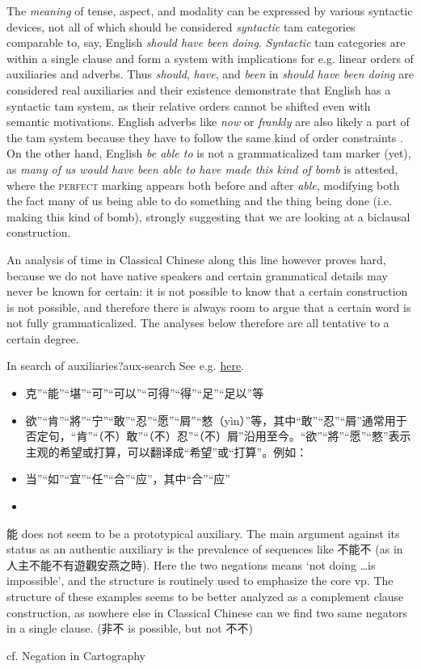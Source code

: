 \documentclass[UTF8, a4paper, oneside, scheme=plain, 12pt]{ctexrep}
\newcommand{\form}[1]{\emph{#1}}
\newcommand{\translate}[1]{`#1'}
\newcommand*{\category}[1]{\textsc{#1}}
\begin{document}
The \emph{meaning} of tense, aspect, and modality can be expressed by various syntactic devices,
not all of which should be considered \emph{syntactic} \ac{tam} categories comparable to, say, English \form{should have been doing}.
\emph{Syntactic} \ac{tam} categories are within a single clause
and form a system with implications for e.g. linear orders of auxiliaries and adverbs.
Thus \form{should}, \form{have}, and \form{been} in \form{should have been doing}
are considered real auxiliaries and their existence demonstrate that English has a syntactic \ac{tam} system,
as their relative orders cannot be shifted even with semantic motivations.
English adverbs like \form{now} or \form{frankly} are also likely a part of the \ac{tam} system
because they have to follow the same kind of order constraints \citep{cinque1999adverbs}.
On the other hand, English \form{be able to} is not a grammaticalized \ac{tam} marker (yet),
as \form{many of us would have been able to have made this kind of bomb} is attested,
where the \category{perfect} marking appears both before and after \form{able},
modifying both the fact many of us being able to do something
and the thing being done (i.e. making this kind of bomb),
strongly suggesting that we are looking at a biclausal construction.

An analysis of time in Classical Chinese along this line however proves hard,
because we do not have native speakers and certain grammatical details may never be known for certain:
it is not possible to know that a certain construction is not possible,
and therefore there is always room to argue that a certain word is not fully grammaticalized.
The analyses below therefore are all tentative to a certain degree.

\begin{todobox}{In search of auxiliaries?}{aux-search}
    See e.g. \href{http://www.ziyexing.com/files-5/guhanyu/guhanyu_3_1.htm}{here}.
    \begin{itemize}
        \item 克”“能”“堪”“可”“可以”“可得”“得”“足”“足以”等
        \item 欲”“肯”“將”“宁”“敢”“忍”“愿”“屑”“憗（yìn）”等，其中“敢”“忍”“屑”通常用于否定句，“肯”“（不）敢”“（不）忍”“（不）屑”沿用至今。“欲”“將”“愿”“憗”表示主观的希望或打算，可以翻译成“希望”或“打算”。例如：
        \item 当”“如”“宜”“任”“合”“应”，其中“合”“应”
        \item 
    \end{itemize}
    
    能 does not seem to be a prototypical auxiliary.
    The main argument against its status as an authentic auxiliary is the prevalence of sequences like 不能不 (as in 人主不能不有遊觀安燕之時).
    Here the two negations means \translate{not doing \dots is impossible},
    and the structure is routinely used to emphasize the core \ac{vp}.
    The structure of these examples seems to be better analyzed as a complement clause construction,
    as nowhere else in Classical Chinese can we find two same negators in a single clause.
    (非不 is possible, but not 不不)

    cf. Negation in Cartography
\end{todobox}
\end{document}
